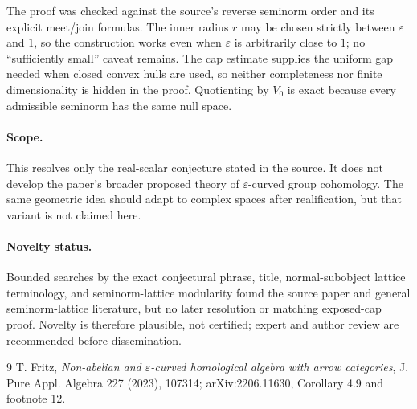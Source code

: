 \documentclass[11pt]{article}
\begin{document}
The proof was checked against the source's reverse seminorm order and its
explicit meet/join formulas.  The inner radius $r$ may be chosen strictly
between $\varepsilon$ and $1$, so the construction works even when
$\varepsilon$ is arbitrarily close to $1$; no ``sufficiently small'' caveat
remains.  The cap estimate supplies the uniform gap needed when closed convex
hulls are used, so neither completeness nor finite dimensionality is hidden in
the proof.  Quotienting by $V_0$ is exact because every admissible seminorm has
the same null space.

\paragraph{Scope.}
This resolves only the real-scalar conjecture stated in the source.  It does
not develop the paper's broader proposed theory of $\varepsilon$-curved group
cohomology.  The same geometric idea should adapt to complex spaces after
realification, but that variant is not claimed here.

\paragraph{Novelty status.}
Bounded searches by the exact conjectural phrase, title, normal-subobject
lattice terminology, and seminorm-lattice modularity found the source paper
and general seminorm-lattice literature, but no later resolution or matching
exposed-cap proof.  Novelty is therefore plausible, not certified; expert and
author review are recommended before dissemination.

\begin{thebibliography}{9}
T. Fritz,
\emph{Non-abelian and $\varepsilon$-curved homological algebra with arrow
categories}, J. Pure Appl. Algebra 227 (2023), 107314;
arXiv:2206.11630, Corollary 4.9 and footnote 12.
\end{thebibliography}
\end{document}
